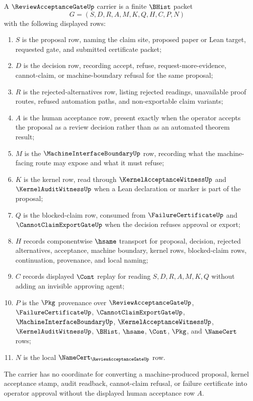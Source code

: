 \begin{definition}
\label{def:review-acceptance-gate-carrier}
A $\ReviewAcceptanceGateUp$ carrier is a finite $\BHist$ packet
$$
G=(S,D,R,A,M,K,Q,H,C,P,N)
$$
with the following displayed rows:
\begin{enumerate}
\item $S$ is the proposal row, naming the claim site, proposed paper or Lean target, requested gate, and submitted certificate packet;
\item $D$ is the decision row, recording accept, refuse, request-more-evidence, cannot-claim, or machine-boundary refusal for the same proposal;
\item $R$ is the rejected-alternatives row, listing rejected readings, unavailable proof routes, refused automation paths, and non-exportable claim variants;
\item $A$ is the human acceptance row, present exactly when the operator accepts the proposal as a review decision rather than as an automated theorem result;
\item $M$ is the $\MachineInterfaceBoundaryUp$ row, recording what the machine-facing route may expose and what it must refuse;
\item $K$ is the kernel row, read through $\KernelAcceptanceWitnessUp$ and $\KernelAuditWitnessUp$ when a Lean declaration or marker is part of the proposal;
\item $Q$ is the blocked-claim row, consumed from $\FailureCertificateUp$ and $\CannotClaimExportGateUp$ when the decision refuses approval or export;
\item $H$ records componentwise $\hsame$ transport for proposal, decision, rejected alternatives, acceptance, machine boundary, kernel rows, blocked-claim rows, continuation, provenance, and local naming;
\item $C$ records displayed $\Cont$ replay for reading $S,D,R,A,M,K,Q$ without adding an invisible approving agent;
\item $P$ is the $\Pkg$ provenance over $\ReviewAcceptanceGateUp$, $\FailureCertificateUp$, $\CannotClaimExportGateUp$, $\MachineInterfaceBoundaryUp$, $\KernelAcceptanceWitnessUp$, $\KernelAuditWitnessUp$, $\BHist$, $\hsame$, $\Cont$, $\Pkg$, and $\NameCert$ rows;
\item $N$ is the local $\NameCert_{\ReviewAcceptanceGateUp}$ row.
\end{enumerate}
The carrier has no coordinate for converting a machine-produced proposal, kernel acceptance stamp, audit readback, cannot-claim refusal, or failure certificate into operator approval without the displayed human acceptance row $A$.
\end{definition}

